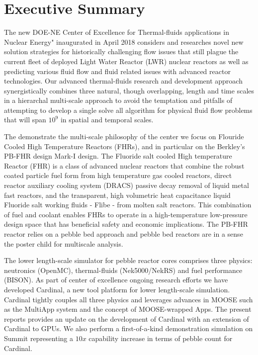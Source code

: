 
\section*{Executive Summary}

The new DOE-NE Center of Excellence for Thermal-fluids applications in Nuclear Energy" inaugurated in
April 2018 considers and researches novel new solution strategies for historically challenging
flow issues that still plague the current  fleet of deployed Light Water Reactor (LWR) nuclear reactors as well as predicting various fluid flow and  fluid related issues with advanced reactor technologies. Our advanced thermal-fluids research and development approach synergistically combines three natural, though overlapping, length and time scales in a hierarchal multi-scale approach to avoid the temptation and pitfalls of attempting to develop a single solve all algorithm for physical  fluid flow problems that will span $10^9$ in spatial and temporal scales.

The demonstrate the multi-scale philosophy of the center we focus on Flouride Cooled High
Temperature Reactors (FHRs), and in particular on the Berkley's PB-FHR design Mark-I design. The
Fluoride salt cooled High temperature Reactor (FHR) is a class of advanced nuclear reactors that combine the
robust coated particle fuel form from high temperature gas cooled reactors, direct reactor auxiliary cooling
system (DRACS) passive decay removal of liquid metal fast reactors, and the transparent, high volumetric heat capacitance liquid Fluoride salt working fluids - Flibe - from molten salt reactors. This combination of fuel and coolant enables FHRs to operate in a high-temperature low-pressure design space that has beneficial safety and economic implications. The PB-FHR reactor relies on a pebble bed approach and pebble bed reactors are in a sense the poster child for multiscale analysis.

The lower length-scale simulator for pebble reactor cores comprises three physics: neutronics (OpenMC),
thermal-fluids (Nek5000/NekRS) and fuel performance (BISON). As part of center of excellence ongoing research efforts we have developed Cardinal, a new tool platform for lower length-scale simulation. Cardinal tightly couples all three physics and leverages advances in MOOSE such as the MultiApp system and the concept of MOOSE-wrapped Apps. The present reports provides an update on the development of Cardinal with an extension of Cardinal to GPUs. We also perform a first-of-a-kind demonstration simulation on Summit representing a $10x$ capability increase in terms of pebble count for Cardinal.
